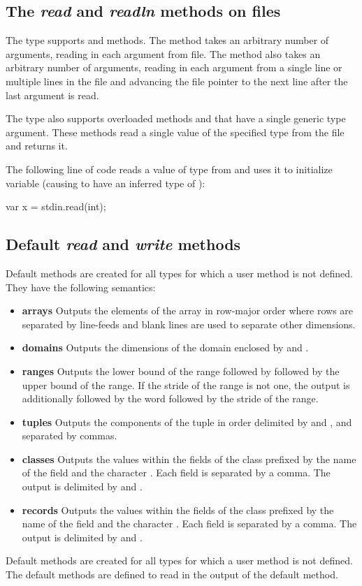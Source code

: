 \subsection{The {\em read} and {\em readln} methods on files}
\label{fileread}

The  type supports  and  methods.
The  method takes an arbitrary number of arguments, reading
in each argument from file.  The  method also
takes an arbitrary number of arguments, reading in each argument
from a single line or multiple lines in the file and 
advancing the file pointer to the next line after the last argument 
is read.

The  type also supports overloaded methods 
and  that have a single generic type argument.  These methods
read a single value of the specified type from the file and returns it.

\begin{example}
The following line of code reads a value of type  from
 and uses it to initialize variable  (causing
 to have an inferred type of ):
\begin{chapel}
var x = stdin.read(int);
\end{chapel}
\end{example}


\subsection{Default {\em read} and {\em write} methods}

Default  methods are created for all types for which a user
 method is not defined.  They have the following semantics:
\begin{itemize}
\item
{\bf arrays} Outputs the elements of the array in row-major order
where rows are separated by line-feeds and blank lines are used to
separate other dimensions.
\item
{\bf domains} Outputs the dimensions of the domain enclosed
by \chpl{[} and \chpl{]}.
\item
{\bf ranges} Outputs the lower bound of the range followed
by  followed by the upper bound of the range.  If the stride
of the range is not one, the output is additionally followed by the
word  followed by the stride of the range.
\item
{\bf tuples} Outputs the components of the tuple in order delimited
by \chpl{(} and \chpl{)}, and separated by commas.
\item
{\bf classes} Outputs the values within the fields of the class
prefixed by the name of the field and the character \chpl{=}.  Each
field is separated by a comma.  The output is delimited by \chpl{\{}
and \chpl{\}}.
\item
{\bf records} Outputs the values within the fields of the class
prefixed by the name of the field and the character \chpl{=}.  Each
field is separated by a comma.  The output is delimited by \chpl{(}
and \chpl{)}.
\end{itemize}

Default  methods are created for all types for which a user
 method is not defined.  The default  methods are
defined to read in the output of the default  method.

